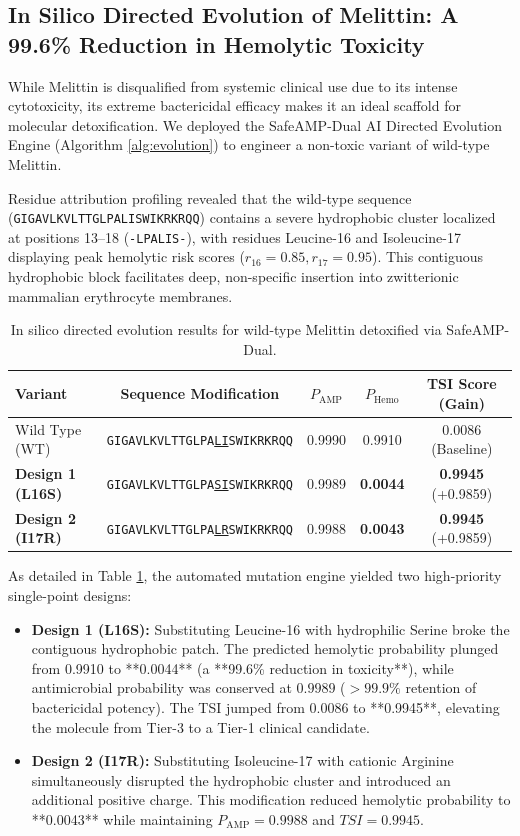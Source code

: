 \documentclass[11pt,a4paper]{article}
\begin{document}
\subsection{In Silico Directed Evolution of Melittin: A 99.6\% Reduction in Hemolytic Toxicity}
While Melittin is disqualified from systemic clinical use due to its intense cytotoxicity, its extreme bactericidal efficacy makes it an ideal scaffold for molecular detoxification. We deployed the SafeAMP-Dual AI Directed Evolution Engine (Algorithm \ref{alg:evolution}) to engineer a non-toxic variant of wild-type Melittin.

Residue attribution profiling revealed that the wild-type sequence (\texttt{GIGAVLKVLTTGLPALISWIKRKRQQ}) contains a severe hydrophobic cluster localized at positions 13--18 (\texttt{-LPALIS-}), with residues Leucine-16 and Isoleucine-17 displaying peak hemolytic risk scores ($r_{16} = 0.85, r_{17} = 0.95$). This contiguous hydrophobic block facilitates deep, non-specific insertion into zwitterionic mammalian erythrocyte membranes.

\begin{table}[htbp]
\centering
\caption{In silico directed evolution results for wild-type Melittin detoxified via SafeAMP-Dual.}
\label{tab:melittin_evolution}
\small
\begin{tabular*}{\textwidth}{@{\extracolsep{\fill}}lcccc@{}}
\toprule
\textbf{Variant} & \textbf{Sequence Modification} & $P_{\text{AMP}}$ & $P_{\text{Hemo}}$ & \textbf{TSI Score (Gain)} \\
\midrule
Wild Type (WT) & \texttt{GIGAVLKVLTTGLPA\underline{LI}SWIKRKRQQ} & 0.9990 & 0.9910 & 0.0086 (Baseline) \\
\textbf{Design 1 (L16S)} & \texttt{GIGAVLKVLTTGLPA\underline{SI}SWIKRKRQQ} & 0.9989 & \textbf{0.0044} & \textbf{0.9945} (+0.9859) \\
\textbf{Design 2 (I17R)} & \texttt{GIGAVLKVLTTGLPA\underline{LR}SWIKRKRQQ} & 0.9988 & \textbf{0.0043} & \textbf{0.9945} (+0.9859) \\
\bottomrule
\end{tabular*}
\end{table}

As detailed in Table \ref{tab:melittin_evolution}, the automated mutation engine yielded two high-priority single-point designs:
\begin{itemize}
    \item \textbf{Design 1 (L16S):} Substituting Leucine-16 with hydrophilic Serine broke the contiguous hydrophobic patch. The predicted hemolytic probability plunged from 0.9910 to **0.0044** (a **99.6\% reduction in toxicity**), while antimicrobial probability was conserved at $0.9989$ ($>99.9\%$ retention of bactericidal potency). The TSI jumped from 0.0086 to **0.9945**, elevating the molecule from Tier-3 to a Tier-1 clinical candidate.
    \item \textbf{Design 2 (I17R):} Substituting Isoleucine-17 with cationic Arginine simultaneously disrupted the hydrophobic cluster and introduced an additional positive charge. This modification reduced hemolytic probability to **0.0043** while maintaining $P_{\text{AMP}} = 0.9988$ and $TSI = 0.9945$.
\end{itemize}
\end{document}
